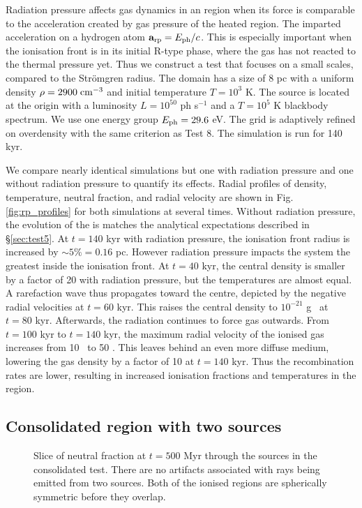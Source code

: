 \documentclass[useAMS,usenatbib]{mn2e}
\begin{document}
Radiation pressure affects gas dynamics in an \hii region when
its force is comparable to the acceleration created by gas pressure of
the heated region.  The imparted acceleration on a hydrogen atom
$\mathbf{a}_{\rm rp} = E_{\rm ph}/c$.  This is especially important
when the ionisation front is in its initial R-type phase, where the
gas has not reacted to the thermal pressure yet.  Thus we construct a
test that focuses on a small scales, compared to the Str\"{o}mgren
radius.  The domain has a size of 8 pc with a uniform density $\rho =
2900\;\cubecm$ and initial temperature $T = 10^3$ K.  The source is
located at the origin with a luminosity $L = 10^{50}$ ph s$^{-1}$ and
a $T=10^5$ K blackbody spectrum.  We use one energy group $E_{\rm ph}
= 29.6$ eV.  The grid is adaptively refined on overdensity with the
same criterion as Test 8.  The simulation is run for 140 kyr.

We compare nearly identical simulations but one with radiation
pressure and one without radiation pressure to quantify its effects.
Radial profiles of density, temperature, neutral fraction, and radial
velocity are shown in Fig. \ref{fig:rp_profiles} for both
simulations at several times.  Without radiation pressure, the
evolution of the \hii is matches the analytical expectations
described in \S\ref{sec:test5}.  At $t=140$ kyr with radiation
pressure, the ionisation front radius is increased by $\sim5\% = 0.16$
pc.  However radiation pressure impacts the system the greatest inside
the ionisation front.  At $t = 40$ kyr, the central density is smaller
by a factor of 20 with radiation pressure, but the temperatures are
almost equal.  A rarefaction wave thus propagates toward the centre,
depicted by the negative radial velocities at $t = 60$ kyr.  This
raises the central density to $10^{-21}$ g \cubecm~at $t = 80$ kyr.
Afterwards, the radiation continues to force gas outwards.  From $t =
100$ kyr to $t = 140$ kyr, the maximum radial velocity of the ionised
gas increases from 10 \kms~to 50 \kms.  This leaves behind an even
more diffuse medium, lowering the gas density by a factor of 10 at $t
= 140$ kyr.  Thus the recombination rates are lower, resulting in
increased ionisation fractions and temperatures in the \hii
region.

\subsection{Consolidated \hii region with two sources}

\begin{figure}
  \caption{\label{fig:twosrc} Slice of neutral fraction at $t = 500$
    Myr through the sources in the consolidated \hii test.
    There are no artifacts associated with rays being emitted from two
    sources.  Both of the ionised regions are spherically symmetric
    before they overlap.}
\end{figure}
\end{document}

